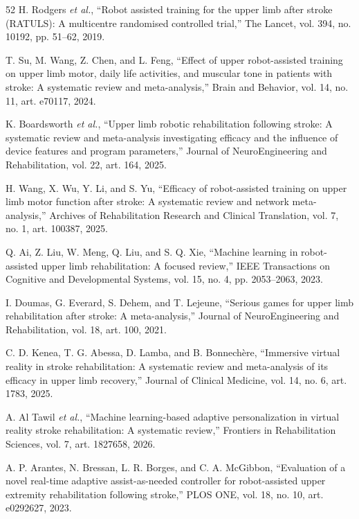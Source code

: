 \documentclass[journal,twoside,web]{ieeecolor2}
\begin{document}
\begin{thebibliography}{52}
\label{bib:b9} H. Rodgers \emph{et al.}, ``Robot assisted training for the upper limb after stroke (RATULS): A multicentre randomised controlled trial,'' The Lancet, vol. 394, no. 10192, pp. 51--62, 2019.

\label{bib:b10} T. Su, M. Wang, Z. Chen, and L. Feng, ``Effect of upper robot-assisted training on upper limb motor, daily life activities, and muscular tone in patients with stroke: A systematic review and meta-analysis,'' Brain and Behavior, vol. 14, no. 11, art. e70117, 2024.

\label{bib:b11} K. Boardsworth \emph{et al.}, ``Upper limb robotic rehabilitation following stroke: A systematic review and meta-analysis investigating efficacy and the influence of device features and program parameters,'' Journal of NeuroEngineering and Rehabilitation, vol. 22, art. 164, 2025.

\label{bib:b12} H. Wang, X. Wu, Y. Li, and S. Yu, ``Efficacy of robot-assisted training on upper limb motor function after stroke: A systematic review and network meta-analysis,'' Archives of Rehabilitation Research and Clinical Translation, vol. 7, no. 1, art. 100387, 2025.

\label{bib:b13} Q. Ai, Z. Liu, W. Meng, Q. Liu, and S. Q. Xie, ``Machine learning in robot-assisted upper limb rehabilitation: A focused review,'' IEEE Transactions on Cognitive and Developmental Systems, vol. 15, no. 4, pp. 2053--2063, 2023.

\label{bib:b14} I. Doumas, G. Everard, S. Dehem, and T. Lejeune, ``Serious games for upper limb rehabilitation after stroke: A meta-analysis,'' Journal of NeuroEngineering and Rehabilitation, vol. 18, art. 100, 2021.

\label{bib:b15} C. D. Kenea, T. G. Abessa, D. Lamba, and B. Bonnechère, ``Immersive virtual reality in stroke rehabilitation: A systematic review and meta-analysis of its efficacy in upper limb recovery,'' Journal of Clinical Medicine, vol. 14, no. 6, art. 1783, 2025.

\label{bib:b16} A. Al Tawil \emph{et al.}, ``Machine learning-based adaptive personalization in virtual reality stroke rehabilitation: A systematic review,'' Frontiers in Rehabilitation Sciences, vol. 7, art. 1827658, 2026.

\label{bib:b17} A. P. Arantes, N. Bressan, L. R. Borges, and C. A. McGibbon, ``Evaluation of a novel real-time adaptive assist-as-needed controller for robot-assisted upper extremity rehabilitation following stroke,'' PLOS ONE, vol. 18, no. 10, art. e0292627, 2023.


\end{thebibliography}
\end{document}
